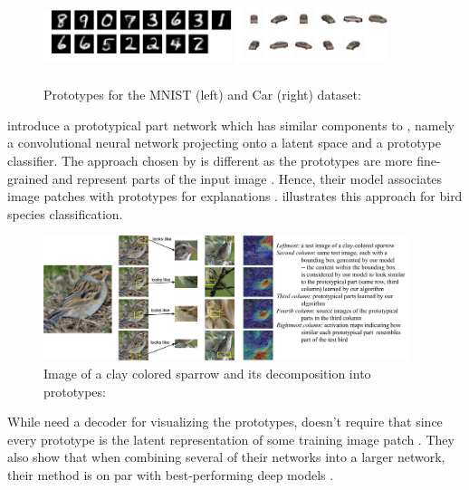 \begin{figure}[h]
    \centering
    \includegraphics[width=0.49\textwidth, height=2cm]{Figures/Chapter3/prototype_result-1499.png}
    \includegraphics[width=0.4\textwidth, height=2cm]{Figures/Chapter3/car_both_R1_and_R2_new.png}
    \caption[Prototypes for the MNIST and Car dataset]{Prototypes for the MNIST (left) and Car (right) dataset: \citep{LiLCR18}}
    \label{fig:prototypes}
\end{figure}

\citet{ChenLTBRS19} introduce a prototypical part network which has similar components to \citet{LiLCR18}, namely a convolutional neural network projecting onto a latent space and a prototype classifier. The approach chosen by \citet{ChenLTBRS19} is different as the prototypes are more fine-grained and represent parts of the input image \citep{xie2020explainable}. Hence, their model associates image patches with prototypes for explanations \citep{xie2020explainable}.  illustrates this approach for bird species classification.

\begin{figure}[h]
    \centering
    \includegraphics[width=0.95\textwidth]{Figures/Chapter3/introbird-1.png}
    \caption[Image of a clay colored sparrow and its decomposition into prototypes]{Image of a clay colored sparrow and its decomposition into prototypes: \citep{ChenLTBRS19}}
    \label{fig:looke_like}
\end{figure}

While \citet{LiLCR18} need a decoder for visualizing the prototypes, \citet{ChenLTBRS19} doesn't require that since every prototype is the latent representation of some training image patch \citep{ChenLTBRS19}. They also show that when combining several of their networks into a larger network, their method is on par with best-performing deep models \citep{ChenLTBRS19}.


